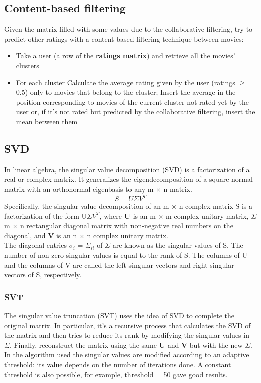 \documentclass{article}
\begin{document}
\subsection{Content-based filtering}
Given the matrix filled with some values due to the collaborative filtering, try to predict other ratings with a content-based filtering technique between movies:
\begin{itemize}
    \item Take a user (a row of the \textbf{ratings matrix}) and retrieve all the movies' clusters
    \item For each cluster
    \subitem Calculate the average rating given by the user (ratings $\ge$ 0.5) only to movies that belong to the cluster;
    \subitem Insert the average in the position corresponding to movies of the current cluster not rated yet by the user or, if it's not rated but predicted by the collaborative filtering, insert the mean between them
\end{itemize}


\subsection{SVD}
In linear algebra, the singular value decomposition (SVD) is a factorization of a real or complex matrix. It generalizes the eigendecomposition of a square normal matrix with an orthonormal eigenbasis to any m × n matrix.
\begin{equation}
      S = U\Sigma V^T
\end{equation}
Specifically, the singular value decomposition of an m $\times$ n complex matrix S is a factorization of the form U$\Sigma V^T$, where \textbf{U} is an m $\times$ m complex unitary matrix, \textbf{$\Sigma$} m $\times$ n rectangular diagonal matrix with non-negative real numbers on the diagonal, and \textbf{V} is an n $\times$ n complex unitary matrix.\\
The diagonal entries $\sigma _{i}$ = $\Sigma _{ii}$ of $\Sigma$ are known as the singular values of S. The number of non-zero singular values is equal to the rank of S. The columns of U and the columns of V are called the left-singular vectors and right-singular vectors of S, respectively.\\

\subsubsection{SVT}
The singular value truncation (SVT) uses the idea of SVD to complete the original matrix. In particular, it's a recursive process that calculates the SVD of the matrix and then tries to reduce its rank by modifying the singular values in $\Sigma$. Finally, reconstruct the matrix using the same \textbf{U} and \textbf{V} but with the new $\Sigma$. In the algorithm used the singular values are modified according to an adaptive threshold: its value depends on the number of iterations done. A constant threshold is also possible, for example, threshold = 50 gave good results.\newline
\end{document}
